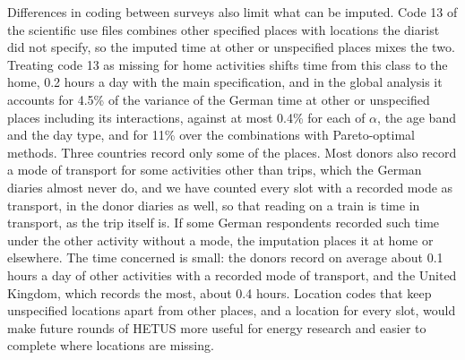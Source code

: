 \documentclass[a4paper]{article}
\begin{document}
Differences in coding between surveys also limit what can be imputed. Code 13 of the scientific use files combines other specified places with locations the diarist did not specify, so the imputed time at other or unspecified places mixes the two. Treating code 13 as missing for home activities shifts time from this class to the home, 0.2 hours a day with the main specification, and in the global analysis it accounts for 4.5\% of the variance of the German time at other or unspecified places including its interactions, against at most 0.4\% for each of $\alpha$, the age band and the day type, and for 11\% over the combinations with Pareto-optimal methods. Three countries record only some of the places. Most donors also record a mode of transport for some activities other than trips, which the German diaries almost never do, and we have counted every slot with a recorded mode as transport, in the donor diaries as well, so that reading on a train is time in transport, as the trip itself is. If some German respondents recorded such time under the other activity without a mode, the imputation places it at home or elsewhere. The time concerned is small: the donors record on average about 0.1 hours a day of other activities with a recorded mode of transport, and the United Kingdom, which records the most, about 0.4 hours. Location codes that keep unspecified locations apart from other places, and a location for every slot, would make future rounds of HETUS more useful for energy research and easier to complete where locations are missing.
\end{document}
